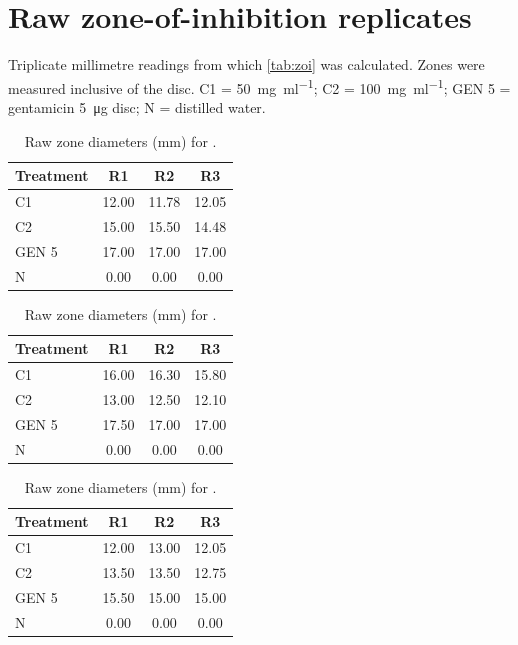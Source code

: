 
\chapter{Raw zone-of-inhibition replicates}\label{app:zoi}

Triplicate millimetre readings from which \cref{tab:zoi} was calculated. Zones were measured inclusive of the disc. C1 = \SI{50}{\milli\gram\per\milli\litre}; C2 = \SI{100}{\milli\gram\per\milli\litre}; GEN 5 = gentamicin \SI{5}{\micro\gram} disc; N = distilled water.

\begin{table}[htbp]
\centering
\caption{Raw zone diameters (mm) for .}
\label{tab:raw_ecoli}
\begin{tabular}{@{}l*{3}{S[table-format=2.2]}@{}}
\toprule
Treatment & {R1} & {R2} & {R3} \\
\midrule
C1 & 12.00 & 11.78 & 12.05 \\
C2 & 15.00 & 15.50 & 14.48 \\
GEN 5 & 17.00 & 17.00 & 17.00 \\
N & 0.00 & 0.00 & 0.00 \\
\bottomrule
\end{tabular}
\end{table}

\begin{table}[htbp]
\centering
\caption{Raw zone diameters (mm) for .}
\label{tab:raw_paer}
\begin{tabular}{@{}l*{3}{S[table-format=2.2]}@{}}
\toprule
Treatment & {R1} & {R2} & {R3} \\
\midrule
C1 & 16.00 & 16.30 & 15.80 \\
C2 & 13.00 & 12.50 & 12.10 \\
GEN 5 & 17.50 & 17.00 & 17.00 \\
N & 0.00 & 0.00 & 0.00 \\
\bottomrule
\end{tabular}
\end{table}

\begin{table}[htbp]
\centering
\caption{Raw zone diameters (mm) for .}
\label{tab:raw_kpneu}
\begin{tabular}{@{}l*{3}{S[table-format=2.2]}@{}}
\toprule
Treatment & {R1} & {R2} & {R3} \\
\midrule
C1 & 12.00 & 13.00 & 12.05 \\
C2 & 13.50 & 13.50 & 12.75 \\
GEN 5 & 15.50 & 15.00 & 15.00 \\
N & 0.00 & 0.00 & 0.00 \\
\bottomrule
\end{tabular}
\end{table}
